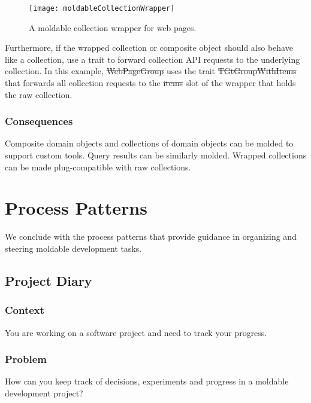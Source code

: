\documentclass[sigconf]{acmart}
\newcommand\on[1]{\nbc{ON}{#1}{olive}} %
\begin{document}
\begin{figure}[h]
  \texttt{[image: moldableCollectionWrapper]}
  \caption{A moldable collection wrapper for web pages.}
  \label{fig:moldableCollectionWrapper}
\end{figure}

Furthermore, if the wrapped collection or composite object should also behave like a collection, use a trait to forward collection API requests to the underlying collection.
In this example, \st{WebPageGroup} uses the trait \st{TGtGroupWithItems} that forwards all collection requests to the \st{items} slot of the wrapper that holds the raw collection.

\subsubsection*{Consequences}
Composite domain objects and collections of domain objects can be molded to support custom tools.
Query results can be similarly molded.
Wrapped collections can be made plug-compatible with raw collections.

\section{Process Patterns}\label{sec:process}

We conclude with the process patterns that provide guidance in organizing and steering moldable development tasks.

\subsection*{Project Diary}\label{pat:projectDiary}

\subsubsection*{Context}
You are working on a software project and need to track your progress.

\subsubsection*{Problem}
How can you keep track of decisions, experiments and progress in a moldable development project?
\end{document}
